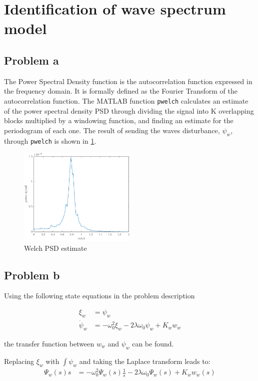 \section{Identification of wave spectrum model}
\subsection{Problem a}
The Power Spectral Density function is the autocorrelation function expressed in the frequency domain. It is formally defined as the Fourier Transform of the autocorrelation function.  The MATLAB function \texttt{pwelch} calculates an estimate of the power spectral density PSD through
dividing the signal into K overlapping blocks multiplied by a windowing function, and finding an
estimate for the periodogram of each one.  The result of sending the waves disturbance, $\psi_w$, through \texttt{pwelch} is shown in \cref{fig:2a-welchPSDestimate}.

\begin{figure}[h]
    \centering
    \includegraphics[width=0.5\textwidth]{images/2a-welchPSDestimate}
    \caption{Welch PSD estimate}
    \label{fig:2a-welchPSDestimate}
\end{figure}

\subsection{Problem b}
Using the following state equations in the problem description \cite{assignment}

\begin{align*}
    \xi_w &= \psi_w \\
    \dot{\psi}_w &= -\omega^2_0\xi_w - 2\lambda\omega_0\psi_w + K_ww_w
\end{align*}

the transfer function between $w_w$ and $\psi_w$ can be found.

Replacing $\xi_w$ with $\int\psi_w$ and taking the Laplace transform leads to:
\begin{align*}
    \Psi_w(s)s &= -\omega^2_0\Psi_w(s)\frac{1}{s} - 2\lambda\omega_0\Psi_w(s) + K_ww_w(s)
\end{align*}

